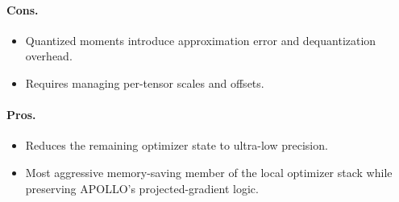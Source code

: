 \paragraph{Cons.}
\begin{itemize}[leftmargin=*]
\item Quantized moments introduce approximation error and dequantization overhead.
\item Requires managing per-tensor scales and offsets.
\end{itemize}

\paragraph{Pros.}
\begin{itemize}[leftmargin=*]
\item Reduces the remaining optimizer state to ultra-low precision.
\item Most aggressive memory-saving member of the local optimizer stack while preserving APOLLO's projected-gradient logic.
\end{itemize}

